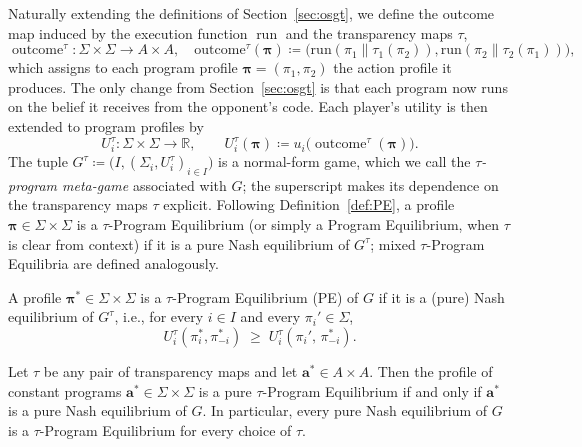 \documentclass[twoside,11pt]{article}
\begin{document}
Naturally extending the definitions of Section~\ref{sec:osgt}, we define the outcome map induced by the execution function $\operatorname{run}$ and the transparency maps $\tau$,
\begin{equation*}
    \operatorname{outcome}^\tau:\Sigma \times \Sigma \to A \times A, \quad \mathrm{outcome}^\tau(\bm{\pi}) \coloneq \biggl(\mathrm{run}(\pi_1 \| \tau_1(\pi_2)), \mathrm{run}(\pi_2 \| \tau_2(\pi_1))\biggr),
\end{equation*}
which assigns to each program profile $\bm{\pi} = (\pi_1, \pi_2)$ the action profile it produces. The only change from Section~\ref{sec:osgt} is that each program now runs on the belief it receives from the opponent's code. Each player's utility is then extended to program profiles by 
\begin{equation*}
    U_i^\tau: \Sigma \times \Sigma \to \mathbb{R},
\qquad
U_i^\tau(\bm{\pi}) \coloneq u_i\bigl(\operatorname{outcome}^\tau(\bm{\pi})\bigr).
\end{equation*}
The tuple $G^\tau \coloneqq \bigl(I, (\Sigma_i, U_i^\tau)_{i \in I}\bigr)$ is a normal-form game, which we call the \emph{$\tau$-program meta-game} associated with $G$; the superscript makes its dependence on the transparency maps $\tau$ explicit. Following Definition~\ref{def:PE}, a profile $\bm{\pi} \in \Sigma \times \Sigma$ is a $\tau$-Program Equilibrium (or simply a Program Equilibrium, when $\tau$ is clear from context) if it is a pure Nash equilibrium of $G^\tau$; mixed $\tau$-Program Equilibria are defined analogously.

\begin{definition}\label{def:tau-PE}
A profile $\bm{\pi}^{*} \in \Sigma \times \Sigma$ is a $\tau$-Program Equilibrium (PE) of $G$ if it is a (pure) Nash equilibrium of $G^\tau$, i.e., for every $i \in I$ and every $\pi_i' \in \Sigma$,
\[
U_i^\tau(\pi_i^{*}, \pi_{-i}^*) \;\ge\; U_i^\tau(\pi_i',\, \pi^{*}_{-i}).
\]
\end{definition}

\begin{theorem}\label{th:NE-is-tau-PE}
Let $\tau$ be any pair of transparency maps and let $\bm{a}^* \in A \times A$. Then the profile of constant programs $\bm{a}^* \in \Sigma \times \Sigma$ is a pure $\tau$-Program Equilibrium if and only if $\bm{a}^*$ is a pure Nash equilibrium of $G$. In particular, every pure Nash equilibrium of $G$ is a $\tau$-Program Equilibrium for every choice of $\tau$.
\end{theorem}
\end{document}
